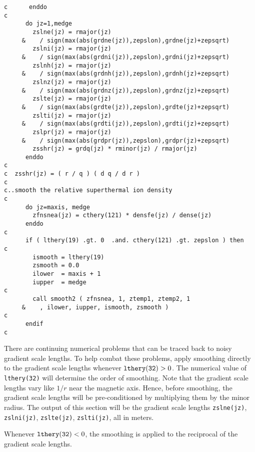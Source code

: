 \begin{verbatim}
c      enddo
c
      do jz=1,medge
        zslne(jz) = rmajor(jz)
     &    / sign(max(abs(grdne(jz)),zepslon),grdne(jz)+zepsqrt)
        zslni(jz) = rmajor(jz)
     &    / sign(max(abs(grdni(jz)),zepslon),grdni(jz)+zepsqrt)
        zslnh(jz) = rmajor(jz)
     &    / sign(max(abs(grdnh(jz)),zepslon),grdnh(jz)+zepsqrt)
        zslnz(jz) = rmajor(jz)
     &    / sign(max(abs(grdnz(jz)),zepslon),grdnz(jz)+zepsqrt)
        zslte(jz) = rmajor(jz)
     &    / sign(max(abs(grdte(jz)),zepslon),grdte(jz)+zepsqrt)
        zslti(jz) = rmajor(jz)
     &    / sign(max(abs(grdti(jz)),zepslon),grdti(jz)+zepsqrt)
        zslpr(jz) = rmajor(jz)
     &    / sign(max(abs(grdpr(jz)),zepslon),grdpr(jz)+zepsqrt)
        zsshr(jz) = grdq(jz) * rminor(jz) / rmajor(jz)
      enddo
c
c  zsshr(jz) = ( r / q ) ( d q / d r )
c
c..smooth the relative superthermal ion density
c
      do jz=maxis, medge
        zfnsnea(jz) = cthery(121) * densfe(jz) / dense(jz)
      enddo
c
      if ( lthery(19) .gt. 0  .and. cthery(121) .gt. zepslon ) then
c
        ismooth = lthery(19)
        zsmooth = 0.0
        ilower  = maxis + 1
        iupper  = medge
c
        call smooth2 ( zfnsnea, 1, ztemp1, ztemp2, 1
     &    , ilower, iupper, ismooth, zsmooth )
c
      endif
c
\end{verbatim}

There are continuing numerical problems that can be traced back to noisy
gradient scale lengths.  To help combat these problems, apply smoothing
directly to the gradient scale lengths whenever ${\tt lthery(32)} > 0 $.
The numerical value of {\tt lthery(32)} will determine the order of 
smoothing.
Note that the gradient scale lengths vary like $1/r$ near the magnetic axis.
Hence, before smoothing, the gradient scale lengths will be pre-conditioned 
by multiplying them by the minor radius.
The output of this section will be the gradient scale lengths
{\tt zslne(jz)}, {\tt zslni(jz)}, {\tt zslte(jz)}, {\tt zslti(jz)},
all in meters.

Whenever ${\tt lthery(32)} < 0 $, the smoothing is applied to the 
reciprocal of the gradient scale lengths.

